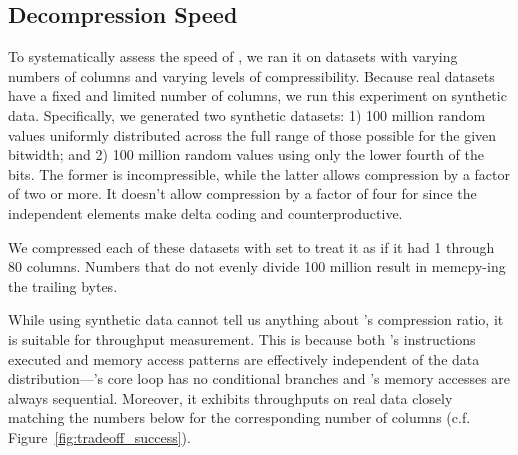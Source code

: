 

\subsection{Decompression Speed} \label{sec:decomp_speed}

To systematically assess the speed of \minesp, we ran it on datasets with varying numbers of columns and varying levels of compressibility. Because real datasets have a fixed and limited number of columns, we run this experiment on synthetic data. Specifically, we generated two synthetic datasets: 1) 100 million random values uniformly distributed across the full range of those possible for the given bitwidth; and 2) 100 million random values using only the lower fourth of the bits. The former is incompressible, while the latter allows compression by a factor of two or more. It doesn't allow compression by a factor of four for \minesp since the independent elements make delta coding and \fire counterproductive.

We compressed each of these datasets with \minesp set to treat it as if it had 1 through 80 columns. Numbers that do not evenly divide 100 million result in \minesp memcpy-ing the trailing bytes.

While using synthetic data cannot tell us anything about \mine's compression ratio, it is suitable for throughput measurement. This is because both \mine's instructions executed and memory access patterns are effectively independent of the data distribution---\mine's core loop has no conditional branches and \minesp's memory accesses are always sequential. Moreover, it exhibits throughputs on real data closely matching the numbers below for the corresponding number of columns (c.f. Figure~\ref{fig:tradeoff_success}). %

